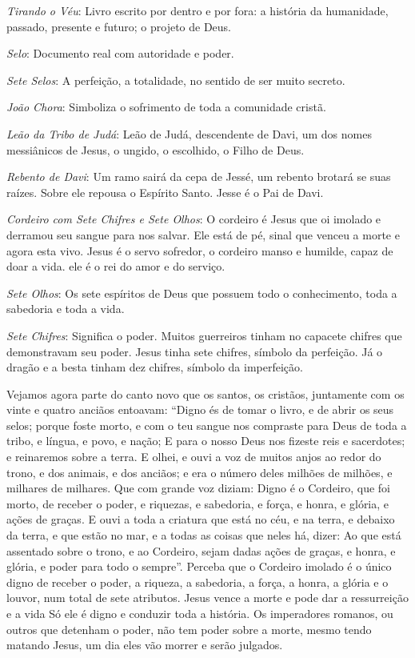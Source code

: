 \documentclass[
]{book}
\begin{document}
\emph{Tirando o Véu}: Livro escrito por dentro e por fora: a história da humanidade, passado, presente e futuro; o projeto de Deus.

\emph{Selo}: Documento real com autoridade e poder.

\emph{Sete Selos}: A perfeição, a totalidade, no sentido de ser muito secreto.

\emph{João Chora}: Simboliza o sofrimento de toda a comunidade cristã.

\emph{Leão da Tribo de Judá}: Leão de Judá, descendente de Davi, um dos nomes messiânicos de Jesus, o ungido, o escolhido, o Filho de Deus.

\emph{Rebento de Davi}: Um ramo sairá da cepa de Jessé, um rebento brotará se suas raízes. Sobre ele repousa o Espírito Santo. Jesse é o Pai de Davi.

\emph{Cordeiro com Sete Chifres e Sete Olhos}: O cordeiro é Jesus que oi imolado e derramou seu sangue para nos salvar. Ele está de pé, sinal que venceu a morte e agora esta vivo. Jesus é o servo sofredor, o cordeiro manso e humilde, capaz de doar a vida. ele é o rei do amor e do serviço.

\emph{Sete Olhos}: Os sete espíritos de Deus que possuem todo o conhecimento, toda a sabedoria e toda a vida.

\emph{Sete Chifres}: Significa o poder. Muitos guerreiros tinham no capacete chifres que demonstravam seu poder. Jesus tinha sete chifres, símbolo da perfeição. Já o dragão e a besta tinham dez chifres, símbolo da imperfeição.

Vejamos agora parte do canto novo que os santos, os cristãos, juntamente com os vinte e quatro anciãos entoavam: ``Digno és de tomar o livro, e de abrir os seus selos; porque foste morto, e com o teu sangue nos compraste para Deus de toda a tribo, e língua, e povo, e nação; E para o nosso Deus nos fizeste reis e sacerdotes; e reinaremos sobre a terra. E olhei, e ouvi a voz de muitos anjos ao redor do trono, e dos animais, e dos anciãos; e era o número deles milhões de milhões, e milhares de milhares. Que com grande voz diziam: Digno é o Cordeiro, que foi morto, de receber o poder, e riquezas, e sabedoria, e força, e honra, e glória, e ações de graças. E ouvi a toda a criatura que está no céu, e na terra, e debaixo da terra, e que estão no mar, e a todas as coisas que neles há, dizer: Ao que está assentado sobre o trono, e ao Cordeiro, sejam dadas ações de graças, e honra, e glória, e poder para todo o sempre''. Perceba que o Cordeiro imolado é o único digno de receber o poder, a riqueza, a sabedoria, a força, a honra, a glória e o louvor, num total de sete atributos. Jesus vence a morte e pode dar a ressurreição e a vida Só ele é digno e conduzir toda a história. Os imperadores romanos, ou outros que detenham o poder, não tem poder sobre a morte, mesmo tendo matando Jesus, um dia eles vão morrer e serão julgados.
\end{document}

